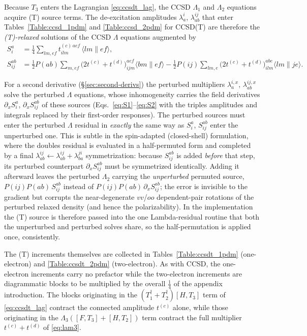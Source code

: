 \documentclass[12pt]{article}
\begin{document}
Because $T_3$ enters the Lagrangian \eqref{eq:ccsdt_lag}, the CCSD $\Lambda_1$ and
$\Lambda_2$ equations acquire (T) source terms.  The de-excitation amplitudes
$\lambda^i_a$, $\lambda^{ij}_{ab}$ that enter Tables~\ref{Table:ccsd_1pdm} and
\ref{Table:ccsd_2pdm} for CCSD(T) are therefore the {\em (T)-relaxed} solutions of
the CCSD $\Lambda$ equations augmented by
\begin{align}
S^a_i    &= \tfrac14 \sum_{lm,ef} t^{(c)\,aef}_{ilm}\,\langle lm\|ef\rangle,
\label{eq:S1}\\[3pt]
S^{ab}_{ij} &= \tfrac12 P(ab)\!\sum_{m,ef}\!\big(2t^{(c)}+t^{(d)}\big)^{aef}_{ijm}\langle bm\|ef\rangle
             - \tfrac12 P(ij)\!\sum_{lm,e}\!\big(2t^{(c)}+t^{(d)}\big)^{abe}_{ilm}\langle lm\|je\rangle.
\label{eq:S2}
\end{align}

For a second derivative (\S\ref{sec:second-derivs}) the perturbed multipliers
$\lambda^{i,x}_a$, $\lambda^{ij,x}_{ab}$ solve the perturbed $\Lambda$ equations,
whose inhomogeneity carries the field derivatives $\partial_x S^a_i$,
$\partial_x S^{ab}_{ij}$ of these sources (Eqs.~\eqref{eq:S1}--\eqref{eq:S2} with the
triples amplitudes and integrals replaced by their first-order responses).  The
perturbed sources must enter the perturbed $\Lambda$ residual in \emph{exactly} the
same way as $S^a_i$, $S^{ab}_{ij}$ enter the unperturbed one.  This is subtle in the
spin-adapted (closed-shell) formulation, where the doubles residual is evaluated in a
half-permuted form and completed by a final $\lambda^{ij}_{ab}\!\leftarrow\!
\lambda^{ij}_{ab}+\lambda^{ji}_{ba}$ symmetrization: because $S^{ab}_{ij}$ is added
\emph{before} that step, its perturbed counterpart $\partial_x S^{ab}_{ij}$ must be
symmetrized identically.  Adding it afterward leaves the perturbed $\Lambda_2$
carrying the \emph{unperturbed} permuted source, $P(ij)P(ab)\,S^{ab}_{ij}$ instead of
$P(ij)P(ab)\,\partial_x S^{ab}_{ij}$; the error is invisible to the gradient but
corrupts the near-degenerate $vv$/$oo$ dependent-pair rotations of the perturbed
relaxed density (and hence the polarizability).  In the implementation the (T) source
is therefore passed into the one Lambda-residual routine that both the unperturbed and
perturbed solves share, so the half-permutation is applied once, consistently.

The (T) increments themselves are collected in Tables~\ref{Table:ccsdt_1pdm}
(one-electron) and \ref{Table:ccsdt_2pdm} (two-electron).  As with CCSD, the
one-electron increments carry no prefactor while the two-electron increments are
diagrammatic blocks to be multiplied by the overall $\frac14$ of the appendix
introduction.  The blocks originating in the $(T_1^{\dagger}+T_2^{\dagger})[H,T_3]$
term of \eqref{eq:ccsdt_lag} contract the connected amplitude $t^{(c)}$ alone,
while those originating in the $\Lambda_3([F,T_3]+[H,T_2])$ term contract the full
multiplier $t^{(c)}+t^{(d)}$ of \eqref{eq:lam3}.
\end{document}
